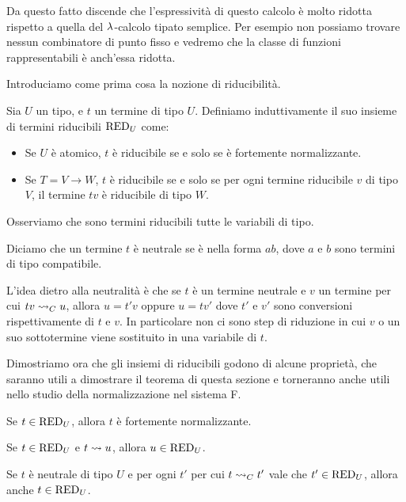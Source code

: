 \documentclass[]{marticle}
\begin{document}
Da questo fatto discende che l'espressivit\`a di questo calcolo \`e molto
ridotta rispetto a quella del $\lambda$-calcolo tipato semplice. Per esempio non
possiamo trovare nessun combinatore di punto fisso e vedremo che la classe di
funzioni rappresentabili \`e anch'essa ridotta.

Introduciamo come prima cosa la nozione di riducibilit\`a. 
\begin{block}[Definizione]
    \label{riducib}
    Sia $U$ un tipo, e $t$ un termine di tipo $U$. Definiamo induttivamente il
    suo insieme di termini riducibili $\text{RED}_{U}$ come:
    \begin{itemize}
        \item Se $U$ \`e atomico, $t$ \`e riducibile se e solo se \`e fortemente
            normalizzante.
        \item Se $T = V \rightarrow W$, $t$ \`e riducibile se e solo se per ogni
            termine riducibile $v$ di tipo $V$, il termine $tv$ \`e riducibile
            di tipo $W$.
    \end{itemize}
\end{block}

Osserviamo che sono termini riducibili tutte le variabili di tipo.

\begin{block}[Definizione]
    \label{neutral}
    Diciamo che un termine $t$ \`e neutrale se \`e nella forma $ab$, dove $a$ e
    $b$ sono termini di tipo compatibile.
\end{block}

L'idea dietro alla neutralit\`a \`e che se $t$ \`e un termine neutrale e $v$ un
termine per cui $tv \rightsquigarrow_C u$, allora $u = t' v$ oppure $u=tv'$ dove $t'$ e $v'$
sono conversioni rispettivamente di $t$ e $v$. In particolare non ci sono
step di riduzione in cui $v$ o un suo sottotermine viene sostituito in una
variabile di $t$.

Dimostriamo ora che gli insiemi di riducibili godono di alcune propriet\`a, che
saranno utili a dimostrare il teorema di questa sezione e torneranno anche utili
nello studio della normalizzazione nel sistema F.

\begin{block}[Proposizione]
    \label{cr}
    \begin{nlist}[CR1]
        \item Se $t\in \text{RED}_{U}$, allora $t$ \`e fortemente normalizzante.
        \item Se $t\in \text{RED}_{U}$ e $t\rightsquigarrow u$, allora $u\in\text{RED}_{U}$.
        \item Se $t$ \`e neutrale di tipo $U$ e per ogni $t'$ per cui $t\rightsquigarrow_C
            t'$ vale che $t'\in\text{RED}_{U}$, allora anche $t\in\text{RED}_{U}$.
    \end{nlist}
\end{block}
\end{document}
